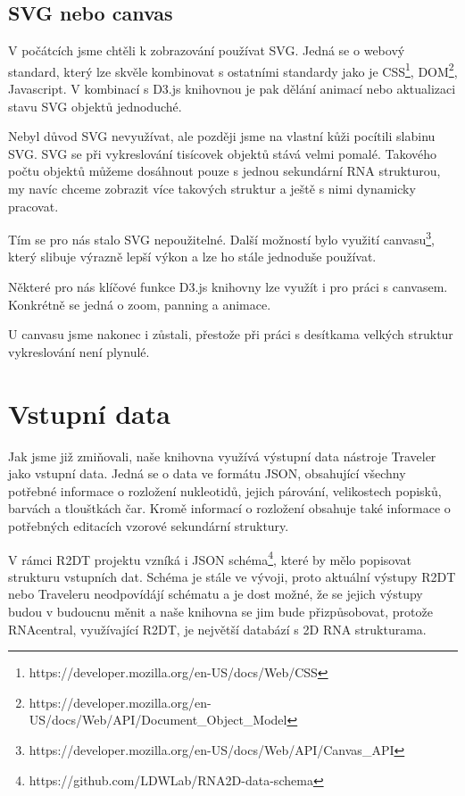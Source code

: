 \subsection{SVG nebo canvas}

V počátcích jsme chtěli k zobrazování používat SVG. Jedná se o webový standard,
který lze skvěle kombinovat s ostatními standardy jako je
CSS\footnote{https://developer.mozilla.org/en-US/docs/Web/CSS},
DOM\footnote{https://developer.mozilla.org/en-US/docs/Web/API/Document_Object_Model},
Javascript. V kombinací s D3.js knihovnou je pak dělání animací nebo
aktualizaci stavu SVG objektů jednoduché.

Nebyl důvod SVG nevyužívat, ale později jsme na vlastní kůži pocítili slabinu
SVG. SVG se při vykreslování tisícovek objektů stává velmi pomalé. Takového
počtu objektů můžeme dosáhnout pouze s jednou sekundární RNA strukturou, my
navíc chceme zobrazit více takových struktur a ještě s nimi dynamicky pracovat. 

Tím se pro nás stalo SVG nepoužitelné. Další možností bylo využití
canvasu\footnote{https://developer.mozilla.org/en-US/docs/Web/API/Canvas_API},
který slibuje výrazně lepší výkon a lze ho stále jednoduše používat.

Některé pro nás klíčové funkce D3.js knihovny lze využít i pro práci s
canvasem. Konkrétně se jedná o zoom, panning a animace.

U canvasu jsme nakonec i zůstali, přestože při práci s desítkama velkých
struktur vykreslování není plynulé.

\section{Vstupní data}

Jak jsme již zmiňovali, naše knihovna využívá výstupní data nástroje Traveler
jako vstupní data. Jedná se o data ve formátu JSON, obsahující všechny potřebné
informace o rozložení nukleotidů, jejich párování, velikostech popisků, barvách
a tlouštkách čar. Kromě informací o rozložení obsahuje také informace o
potřebných editacích vzorové sekundární struktury.

V rámci R2DT projektu vzníká i JSON
schéma\footnote{https://github.com/LDWLab/RNA2D-data-schema}, které by mělo
popisovat strukturu vstupních dat. Schéma je stále ve vývoji, proto aktuální
výstupy R2DT nebo Traveleru neodpovídájí schématu a je dost možné, že se jejich
výstupy budou v budoucnu měnit a naše knihovna se jim bude přizpůsobovat,
protože RNAcentral, využívající R2DT, je největší databází s
2D RNA strukturama.


